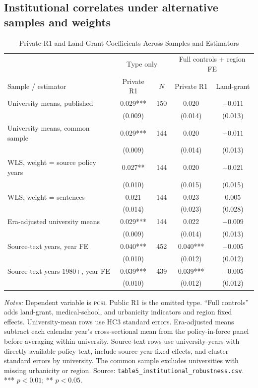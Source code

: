 \subsection{Institutional correlates under alternative samples and weights}

\begin{table}[htbp]
\centering
\caption{Private-R1 and Land-Grant Coefficients Across Samples and Estimators}
\label{tab:inst-robust}
\begin{tabular}{lcccc}
\hline
 & \multicolumn{2}{c}{Type only} & \multicolumn{2}{c}{Full controls + region FE} \\
Sample / estimator & Private R1 & $N$ & Private R1 & Land-grant \\
\hline
University means, published & 0.029*** & 150 & 0.020 & $-0.011$ \\
 & (0.009) & & (0.014) & (0.013) \\
University means, common sample & 0.029*** & 144 & 0.020 & $-0.011$ \\
 & (0.009) & & (0.014) & (0.013) \\
WLS, weight = source policy years & 0.027** & 144 & 0.020 & $-0.021$ \\
 & (0.010) & & (0.015) & (0.015) \\
WLS, weight = sentences & 0.021 & 144 & 0.023 & 0.005 \\
 & (0.014) & & (0.023) & (0.028) \\
Era-adjusted university means & 0.029*** & 144 & 0.022 & $-0.009$ \\
 & (0.009) & & (0.014) & (0.013) \\
Source-text years, year FE & 0.040*** & 452 & 0.040*** & $-0.005$ \\
 & (0.010) & & (0.012) & (0.012) \\
Source-text years 1980+, year FE & 0.039*** & 439 & 0.039*** & $-0.005$ \\
 & (0.010) & & (0.012) & (0.012) \\
\hline
\end{tabular}
\begin{minipage}{0.95\textwidth}\footnotesize
\vspace{4pt}
\textit{Notes:} Dependent variable is \textsc{pcsi}. Public R1 is the omitted type. ``Full controls'' adds land-grant, medical-school, and urbanicity indicators and region fixed effects. University-mean rows use HC3 standard errors. Era-adjusted means subtract each calendar year's cross-sectional mean from the policy-in-force panel before averaging within university. Source-text rows use university-years with directly available policy text, include source-year fixed effects, and cluster standard errors by university. The common sample excludes universities with missing urbanicity or region. Source: \texttt{table5\_institutional\_robustness.csv}. *** $p<0.01$; ** $p<0.05$.
\end{minipage}
\end{table}

